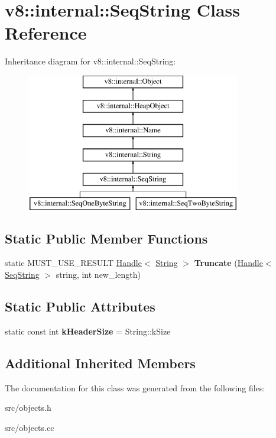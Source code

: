 \hypertarget{classv8_1_1internal_1_1_seq_string}{}\section{v8\+:\+:internal\+:\+:Seq\+String Class Reference}
\label{classv8_1_1internal_1_1_seq_string}
Inheritance diagram for v8\+:\+:internal\+:\+:Seq\+String\+:\begin{figure}[H]
\begin{center}
\leavevmode
\includegraphics[height=6.000000cm]{classv8_1_1internal_1_1_seq_string}
\end{center}
\end{figure}
\subsection*{Static Public Member Functions}
\begin{DoxyCompactItemize}
\item 
\hypertarget{classv8_1_1internal_1_1_seq_string_a458de3667396155cbc7b3e5e89ea9774}{}static M\+U\+S\+T\+\_\+\+U\+S\+E\+\_\+\+R\+E\+S\+U\+L\+T \hyperlink{classv8_1_1internal_1_1_handle}{Handle}$<$ \hyperlink{classv8_1_1internal_1_1_string}{String} $>$ {\bfseries Truncate} (\hyperlink{classv8_1_1internal_1_1_handle}{Handle}$<$ \hyperlink{classv8_1_1internal_1_1_seq_string}{Seq\+String} $>$ string, int new\+\_\+length)\label{classv8_1_1internal_1_1_seq_string_a458de3667396155cbc7b3e5e89ea9774}

\end{DoxyCompactItemize}
\subsection*{Static Public Attributes}
\begin{DoxyCompactItemize}
\item 
\hypertarget{classv8_1_1internal_1_1_seq_string_a2c2ba2c9718ba1841132c6b9c32ada47}{}static const int {\bfseries k\+Header\+Size} = String\+::k\+Size\label{classv8_1_1internal_1_1_seq_string_a2c2ba2c9718ba1841132c6b9c32ada47}

\end{DoxyCompactItemize}
\subsection*{Additional Inherited Members}


The documentation for this class was generated from the following files\+:\begin{DoxyCompactItemize}
\item 
src/objects.\+h\item 
src/objects.\+cc\end{DoxyCompactItemize}
